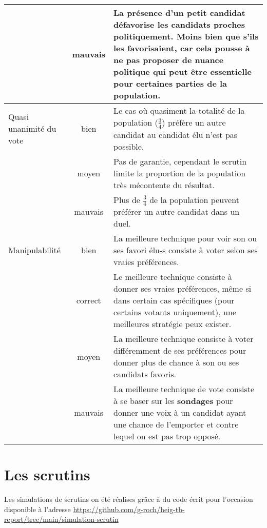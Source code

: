 \documentclass[../report]{subfiles}
\begin{document}
\begin{table}
\begin{center}
\begin{tabular}{p{8em}|c|p{28em}}
                       & \cellcolor{red}mauvais &  La présence d'un petit candidat \textbf{défavorise} les candidats proches politiquement. Moins bien que s'ils les favorisaient, car cela pousse à ne pas proposer de nuance politique qui peut être essentielle pour certaines parties de la population. \\
      \hline
      Quasi unanimité du vote  & \cellcolor{green}bien & Le cas où quasiment la totalité de la population ($\frac{3}{4}$) préfère un autre candidat au candidat élu n'est pas possible. \\
      \cline{2-3}
                       & \cellcolor{orange}moyen & Pas de garantie, cependant le scrutin limite la proportion de la population très mécontente du résultat. \\
      \cline{2-3}
                       & \cellcolor{red}mauvais & Plus de $\frac{3}{4}$ de la population peuvent préférer un autre candidat dans un duel. \\
      \hline
      Manipulabilité & \cellcolor{green}bien & La meilleure technique pour voir son ou ses favori élu-s consiste à voter selon ses vraies préférences. \\
      \cline{2-3}
                     & \cellcolor{green!25!yellow}correct & Le meilleure technique consiste à donner ses vraies préférences, même si dans certain cas spécifiques (pour certains votants uniquement), une meilleures stratégie peux exister. \\
      \cline{2-3}
                     & \cellcolor{orange}moyen & La meilleure technique consiste à voter différemment de ses préférences pour donner plus de chance à son ou ses candidats favoris. \\
      \cline{2-3}
                     & \cellcolor{red}mauvais & La meilleure technique de vote consiste à se baser sur les \textbf{sondages} pour donner une voix à un candidat ayant une chance de l'emporter et contre lequel on est pas trop opposé. \\
      \hline
    \end{tabular}
  \end{center}
  \end{table}

  \chapter{Les scrutins}
  
  Les simulations de scrutins on été réalises grâce à du code écrit pour l'occasion disponible 
  à l'adresse \url{https://github.com/g-roch/heig-tb-report/tree/main/simulation-scrutin}
\end{document}

